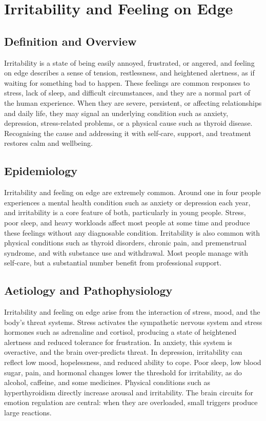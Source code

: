 \chapter{Irritability and Feeling on Edge}

\section*{Definition and Overview}
Irritability is a state of being easily annoyed, frustrated, or angered, and feeling on edge describes a sense of tension, restlessness, and heightened alertness, as if waiting for something bad to happen. These feelings are common responses to stress, lack of sleep, and difficult circumstances, and they are a normal part of the human experience. When they are severe, persistent, or affecting relationships and daily life, they may signal an underlying condition such as anxiety, depression, stress-related problems, or a physical cause such as thyroid disease. Recognising the cause and addressing it with self-care, support, and treatment restores calm and wellbeing.

\section*{Epidemiology}
Irritability and feeling on edge are extremely common. Around one in four people experiences a mental health condition such as anxiety or depression each year, and irritability is a core feature of both, particularly in young people. Stress, poor sleep, and heavy workloads affect most people at some time and produce these feelings without any diagnosable condition. Irritability is also common with physical conditions such as thyroid disorders, chronic pain, and premenstrual syndrome, and with substance use and withdrawal. Most people manage with self-care, but a substantial number benefit from professional support.

\section*{Aetiology and Pathophysiology}
Irritability and feeling on edge arise from the interaction of stress, mood, and the body's threat systems. Stress activates the sympathetic nervous system and stress hormones such as adrenaline and cortisol, producing a state of heightened alertness and reduced tolerance for frustration. In anxiety, this system is overactive, and the brain over-predicts threat. In depression, irritability can reflect low mood, hopelessness, and reduced ability to cope. Poor sleep, low blood sugar, pain, and hormonal changes lower the threshold for irritability, as do alcohol, caffeine, and some medicines. Physical conditions such as hyperthyroidism directly increase arousal and irritability. The brain circuits for emotion regulation are central: when they are overloaded, small triggers produce large reactions.

